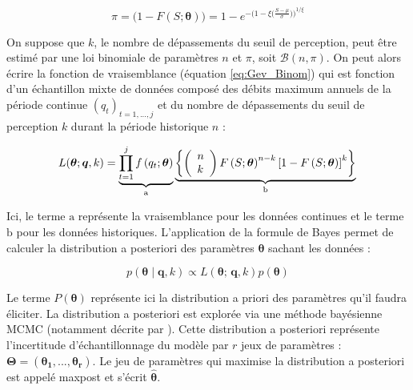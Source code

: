 \documentclass[11pt]{article}
\begin{document}
		\begin{equation}
			\pi = \biggl( 1 - F(S;\boldsymbol{\theta})\biggl) = 1 - e^{-\biggl(1-\xi\bigl(\frac{S-\mu}{\sigma}\bigl)\biggl)^{1/\xi} }		
		\end{equation}
			 
	On suppose que $k$, le nombre de dépassements du seuil de perception, peut être estimé par une loi binomiale de paramètres $n$ et $\pi$, soit $\mathcal{B}(n,\pi)$. On peut alors écrire la fonction de vraisemblance (équation \ref{eq:Gev_Binom}) qui est fonction d'un échantillon mixte de données composé des débits maximum annuels de la période continue $(q_t)_{t=1,...,j}$ et du nombre de dépassements du seuil de perception $k$ durant la période historique $n$ :
		
			\begin{equation}
			L(\boldsymbol{\theta} ; \boldsymbol{q}, k) = \underbrace{\prod_{t=1}^j f\left(q_t;\boldsymbol{\theta}\right)}_{\mathrm{a}} \underbrace{\left\{\left(\begin{array}{l}
			n \\
			k
			\end{array}\right) F\left(S;\boldsymbol{\theta}\right)^{n-k}\left[1-F\left(S;\boldsymbol{\theta}\right)\right]^k\right\}}_{\mathrm{b}} \\
			\label{eq:Gev_Binom}
			\end{equation}
			
			Ici, le terme $\mathrm{a}$ représente la vraisemblance pour les données continues et le terme $\mathrm{b}$ pour les données historiques. L'application de la formule de Bayes permet de calculer la distribution a posteriori des paramètres $\boldsymbol{\theta}$ sachant les données :
			
			\begin{equation}
				p(\boldsymbol{\theta} \mid \boldsymbol{q},k) \propto L(\boldsymbol{\theta};\,\boldsymbol{q},k) p(\boldsymbol{\theta})
				\label{eq:BayesBinom}
			\end{equation}
	
		Le terme $P(\boldsymbol{\theta})$ représente ici la distribution a priori des paramètres qu'il faudra éliciter. La distribution a posteriori est explorée via une méthode bayésienne MCMC (notamment décrite par \citet{coles_classical_2001}). Cette distribution a posteriori représente l'incertitude d'échantillonnage du modèle par $r$ jeux de paramètres : $\boldsymbol{\Theta} = (\boldsymbol{\theta_1},...,\boldsymbol{\theta_r})$. Le jeu de paramètres qui maximise la distribution a posteriori est appelé maxpost et s'écrit $\boldsymbol{ \hat{\theta} }$.
	
\end{document}
